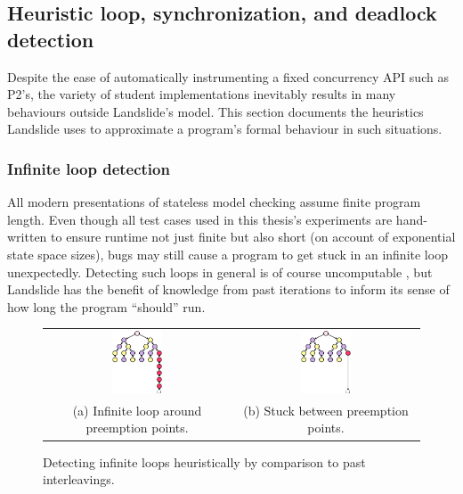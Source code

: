 
\subsection{Heuristic loop, synchronization, and deadlock detection}
\label{sec:landslide-blocking}

Despite the ease of automatically instrumenting a fixed concurrency API such as P2's,
the variety of student implementations inevitably results in many behaviours outside Landslide's model.
This section documents the heuristics Landslide uses to approximate a program's formal behaviour in such situations.

\subsubsection{Infinite loop detection}

All modern presentations of stateless model checking assume finite program length.
Even though all test cases used in this thesis's experiments are hand-written to ensure runtime
not just finite but also short (on account of exponential state space sizes),
bugs may still cause a program to get stuck in an infinite loop unexpectedly.
Detecting such loops in general is of course uncomputable \cite{entscheidungsproblem},
but Landslide has the benefit of knowledge from past iterations to inform its sense of how long the program ``should'' run.

\begin{figure}[h]
	\begin{center}
		\begin{tabular}{cc}
			\includegraphics[width=0.28\textwidth]{heuristic-livelock.pdf}
			&
			\includegraphics[width=0.28\textwidth]{heuristic-tightloop.pdf}
			\\
			(a) Infinite loop around preemption points.
			&
			(b) Stuck between preemption points.
		\end{tabular}
	\end{center}
	\caption{Detecting infinite loops heuristically by comparison to past interleavings.}
	\label{fig:heuristic-loop}
\end{figure}

